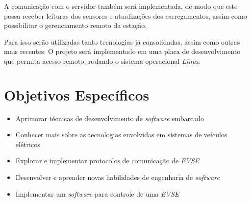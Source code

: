     A comunicação com o servidor também será implementada, de modo que este possa receber leituras dos sensores e atualizações dos carregamentos, assim como possibilitar o gerenciamento remoto da estação.

    Para isso serão utilizadas tanto tecnologias já consolidadas, assim como outras mais recentes. O projeto será implementado em uma placa de desenvolvimento que permita acesso remoto, rodando o sistema operacional \textit{Linux}.

  \section{Objetivos Específicos}
  \label{stateofart:intro:specificobjectives}

    \begin{itemize}
      \item Aprimorar técnicas de desenvolvimento de \textit{software} embarcado
      \item Conhecer mais sobre as tecnologias envolvidas em sistemas de veículos elétricos
      \item Explorar e implementar protocolos de comunicação de \textit{\ac{EVSE}}
      \item Desenvolver e aprender novas habilidades de engenharia de \textit{software}
      \item Implementar um \textit{software} para controle de uma \textit{\ac{EVSE}}
    \end{itemize}
